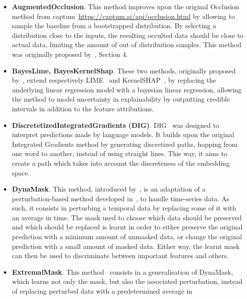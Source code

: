 \begin{itemize}
    \item \textbf{AugmentedOcclusion}.
        This method improves upon the original Occlusion method from captum~\url{https://captum.ai/api/occlusion.html}
        by allowing to sample the baseline from a bootstrapped distribution.
        By selecting a distribution close to the inputs, the resulting occulted data should be close to actual data,
        limiting the amount of out of distribution samples.
        This method was originally proposed by~\citep{tonekaboni2020went}, Section 4.
    \item \textbf{BayesLime, BayesKernelShap}.
        These two methods, originally proposed by~\citep{slack2021reliable}, extend respectively
        LIME~\citep{ribeiro2016should} and KernelSHAP~\citep{lundberg2017unified}, by replacing the underlying
        linear regression model with a bayesian linear regression, allowing the method to model uncertainty in
        explainability by outputting credible intervals in addition to the feature attributions.
    \item \textbf{DiscretetizedIntegratedGradients (DIG)}.
        DIG~\citep{sanyal2021discretized} was designed to interpret predictions made by language models.
        It builds upon the original Integrated Gradients method by generating discretized paths, hopping from one
        word to another, instead of using straight lines.
        This way, it aims to create a path which takes into account the discreteness of the embedding space.
    \item \textbf{DynaMask}.
        This method, introduced by~\citep{crabbe2021explaining}, is an adaptation of a perturbation-based method
        developed in~\citep{fong2017interpretable, fong2019understanding}, to handle time-series data.
        As such, it consists in perturbing a temporal data by replacing some of it with an average in time.
        The mask used to choose which data should be preserved and which should be replaced is learnt in order to either
        preserve the original prediction with a minimum amount of unmasked data, or change the original prediction with
        a small amount of masked data.
        Either way, the learnt mask can then be used to discriminate between important features and others.
    \item \textbf{ExtremalMask}.
        This method~\citep{enguehard2023learning} consists in a generalisation of DynaMask, which learns not only the
        mask, but also the associated perturbation, instead of replacing perturbed data with a predetermined average in

\end{itemize}
